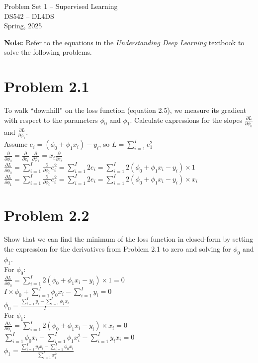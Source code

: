 \documentclass[10pt]{article}
\begin{document}
\begin{center}
    \LARGE {Problem Set 1 – Supervised Learning} \\[1em]
    \Large{DS542 – DL4DS} \\[0.5em]
    \large Spring, 2025
\end{center}

\vspace{2em}

\noindent\textbf{Note:} Refer to the equations in the \textit{Understanding Deep Learning} textbook to solve the following problems.

\vspace{5em}

\section*{Problem 2.1}

To walk “downhill” on the loss function (equation 2.5), we measure its gradient with respect to the parameters $\phi_0$ and $\phi_1$. Calculate expressions for the slopes $\frac{\partial L}{\partial \phi_0}$ and $\frac{\partial L}{\partial \phi_1}$. \\
Assume $e_i = (\phi_0 + \phi_1 x_i) - y_i$, so $L = \sum_{i=1}^{I} e_1^2$ \\
$\frac{\partial}{\partial \phi_0} = \frac{\partial}{\partial e_i}$   $\frac{\partial}{\partial \phi_1} = x_i\frac{\partial}{\partial e_i}$ \\
$\frac{\partial L}{\partial \phi_0} = \sum_{i=1}^{I} \frac{\partial}{\partial \phi_0}e_i^2 = \sum_{i=1}^{I} 2e_i = \sum_{i=1}^{I} 2(\phi_0 + \phi_1 x_i - y_i) \times 1$ \\
$\frac{\partial L}{\partial \phi_1} = \sum_{i=1}^{I} \frac{\partial}{\partial \phi_0}e_i^2 = \sum_{i=1}^{I} 2e_i = \sum_{i=1}^{I} 2(\phi_0 + \phi_1 x_i - y_i) \times x_i$ \\

\section*{Problem 2.2}

Show that we can find the minimum of the loss function in closed-form by setting the expression for the derivatives from Problem 2.1 to zero and solving for $\phi_0$ and $\phi_1$. \\
For $\phi_0 : $ \\
$\frac{\partial L}{\partial \phi_0} =  \sum_{i=1}^{I} 2(\phi_0 + \phi_1 x_i - y_i) \times 1 = 0$ \\
$I \times \phi_0 + \sum_{i=1}^{I} \phi_0 x_i - \sum_{i=1}^{I} y_i = 0$ \\
$\phi_0 = \frac{\sum_{i=1}^{I} y_i - \sum_{i=1}^{I} \phi_1 x_i}{I}$ \\
For $\phi_1 : $ \\
$\frac{\partial L}{\partial \phi_1} =  \sum_{i=1}^{I} 2(\phi_0 + \phi_1 x_i - y_i) \times x_i = 0$ \\
$\sum_{i=1}^{I} \phi_0 x_i + \sum_{i=1}^{I} \phi_1 x_i^2 - \sum_{i=1}^{I} y_i x_i = 0$ \\
$\phi_1 = \frac{\sum_{i=1}^{I} y_i x_i - \sum_{i=1}^{I} \phi_0 x_i}{\sum_{i=1}^{I} x_i^2}$ \\
\end{document}
